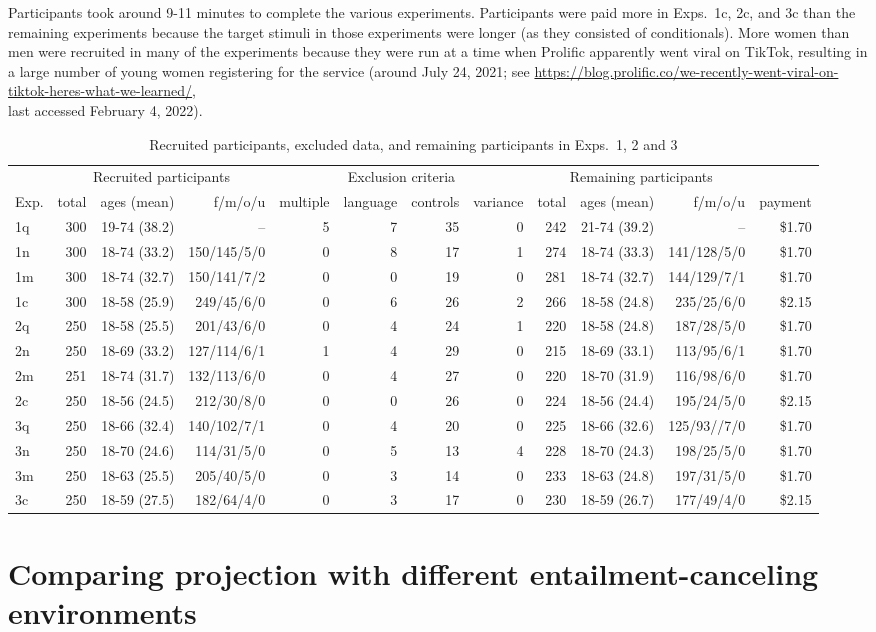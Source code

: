 \documentclass[11pt,fleqn]{article}
\newcommand{\6}{\mbox{$[\hspace*{-.6mm}[$}}
\newcommand{\9}{\mbox{$]\hspace*{-.6mm}]$}}
\begin{document}
Participants took around 9-11 minutes to complete the various experiments. Participants were paid more in Exps.~1c, 2c, and 3c than the remaining experiments because the target stimuli in those experiments were longer (as they consisted of conditionals). More women than men were recruited in many of the experiments because they were run at a time when Prolific apparently went viral on TikTok, resulting in a large number of young women registering for the service (around July 24, 2021; see \url{https://blog.prolific.co/we-recently-went-viral-on-tiktok-heres-what-we-learned/}, \\ last accessed February 4, 2022).  

\begin{table}
\centering
\begin{tabular}{l | r r r | r r r r | r r r | r }
&  \multicolumn{3}{c|}{Recruited participants} & \multicolumn{4}{c|}{Exclusion criteria} & \multicolumn{3}{c|}{Remaining participants} &  \\ 
Exp. & total & ages (mean) & f/m/o/u & multiple & language & controls & variance & total & ages (mean) & f/m/o/u & payment   \\ 
\hline
1q & 300  & 19-74 (38.2)  & --  & 5  & 7  & 35  & 0  & 242   & 21-74 (39.2) &  -- & \$1.70\\
1n & 300  & 18-74 (33.2)  &  150/145/5/0 & 0  & 8 & 17 & 1 & 274  & 18-74 (33.3) & 141/128/5/0 & \$1.70\\
1m & 300  & 18-74 (32.7) & 150/141/7/2  &  0 & 0  & 19 & 0   & 281   & 18-74 (32.7) & 144/129/7/1 & \$1.70 \\
1c &  300 & 18-58 (25.9)  & 249/45/6/0 & 0 & 6  & 26 & 2  & 266  &  18-58 (24.8) & 235/25/6/0  & \$2.15 \\
2q & 250  &  18-58 (25.5) &  201/43/6/0  & 0 & 4  & 24  & 1 & 220  & 18-58 (24.8)  & 187/28/5/0  & \$1.70 \\
2n & 250  &  18-69 (33.2)  &  127/114/6/1 & 1  & 4  & 29 & 0& 215  &  18-69 (33.1) & 113/95/6/1    & \$1.70\\
2m & 251  & 18-74 (31.7)  & 132/113/6/0  & 0  & 4  & 27 &  0 & 220  & 18-70 (31.9) & 116/98/6/0 & \$1.70\\
2c &  250 &  18-56 (24.5)  & 212/30/8/0  & 0  & 0  & 26 & 0  & 224  & 18-56 (24.4) & 195/24/5/0 & \$2.15\\
3q & 250  &  18-66 (32.4) &  140/102/7/1 &  0 & 4  & 20  & 0  &  225 & 18-66 (32.6) & 125/93//7/0  & \$1.70 \\
3n & 250  &  18-70 (24.6) & 114/31/5/0  & 0  & 5  &  13 & 4  & 228  & 18-70 (24.3) &  198/25/5/0 &\$1.70 \\
3m & 250  & 18-63 (25.5)  & 205/40/5/0 &  0 & 3  & 14 &  0 & 233  &  18-63 (24.8) & 197/31/5/0 &\$1.70 \\
3c & 250  & 18-59  (27.5) & 182/64/4/0  & 0  & 3  & 17 & 0 & 230  &  18-59 (26.7)  & 177/49/4/0  & \$2.15\\
\end{tabular}
\caption{Recruited participants, excluded data, and remaining participants in Exps.~1, 2 and 3}\label{f-exclusion}
\end{table} 

\section{Comparing projection with different entailment-canceling environments}\label{a-projection}
 
\end{document}
